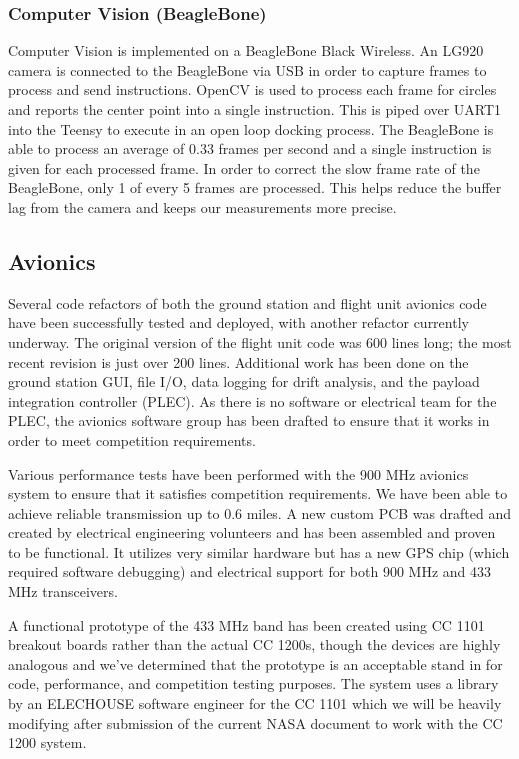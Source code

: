 \documentclass[journal,10pt,draftclsnofoot,onecolumn,compsoc]{IEEEtran} \usepackage[margin=0.75in]{geometry}
\begin{document}
\subsubsection {Computer Vision (BeagleBone)}

Computer Vision is implemented on a BeagleBone Black Wireless. An LG920 camera is connected to the BeagleBone via USB in order to capture frames to process and send instructions. OpenCV is used to process each frame for circles and reports the center point into a single instruction. This is piped over UART1 into the Teensy to execute in an open loop docking process. The BeagleBone is able to process an average of 0.33 frames per second and a single instruction is given for each processed frame. In order to correct the slow frame rate of the BeagleBone, only 1 of every 5 frames are processed. This helps reduce the buffer lag from the camera and keeps our measurements more precise. 


\subsection{Avionics}
Several code refactors of both the ground station and flight unit avionics code have been successfully tested and deployed, with another refactor currently underway. The original version of the flight unit code was 600 lines long; the most recent revision is just over 200 lines. Additional work has been done on the ground station GUI, file I/O, data logging for drift analysis, and the payload integration controller (PLEC). As there is no software or electrical team for the PLEC, the avionics software group has been drafted to ensure that it works in order to meet competition requirements. \newline

\noindent Various performance tests have been performed with the 900 MHz avionics system to ensure that it satisfies competition requirements. We have been able to achieve reliable transmission up to 0.6 miles. A new custom PCB was drafted and created by electrical engineering volunteers and has been assembled and proven to be functional. It utilizes very similar hardware but has a new GPS chip (which required software debugging) and electrical support for both 900 MHz and 433 MHz transceivers.\newline

\noindent A functional prototype of the 433 MHz band has been created using CC 1101 breakout boards rather than the actual CC 1200s, though the devices are highly analogous and we've determined that the prototype is an acceptable stand in for code, performance, and competition testing purposes. The system uses a library by an ELECHOUSE software engineer for the CC 1101 which we will be heavily modifying after submission of the current NASA document to work with the CC 1200 system. \newline
\end{document}
